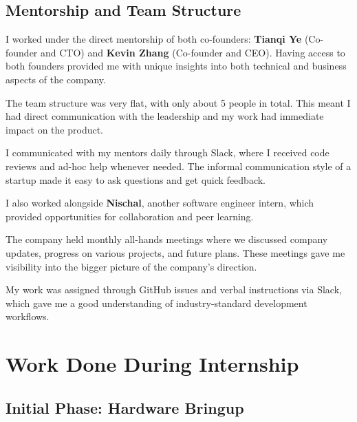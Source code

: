 \documentclass[12pt,a4paper]{report}
\begin{document}
\section{Mentorship and Team Structure}

I worked under the direct mentorship of both co-founders: \textbf{Tianqi Ye} (Co-founder and CTO) and \textbf{Kevin Zhang} (Co-founder and CEO). Having access to both founders provided me with unique insights into both technical and business aspects of the company.

\vspace{0.3cm}

The team structure was very flat, with only about 5 people in total. This meant I had direct communication with the leadership and my work had immediate impact on the product.

\vspace{0.3cm}

I communicated with my mentors daily through Slack, where I received code reviews and ad-hoc help whenever needed. The informal communication style of a startup made it easy to ask questions and get quick feedback.

\vspace{0.3cm}

I also worked alongside \textbf{Nischal}, another software engineer intern, which provided opportunities for collaboration and peer learning.

\vspace{0.3cm}

The company held monthly all-hands meetings where we discussed company updates, progress on various projects, and future plans. These meetings gave me visibility into the bigger picture of the company's direction.

\vspace{0.3cm}

My work was assigned through GitHub issues and verbal instructions via Slack, which gave me a good understanding of industry-standard development workflows.

\chapter{Work Done During Internship}

\section{Initial Phase: Hardware Bringup}
\end{document}
